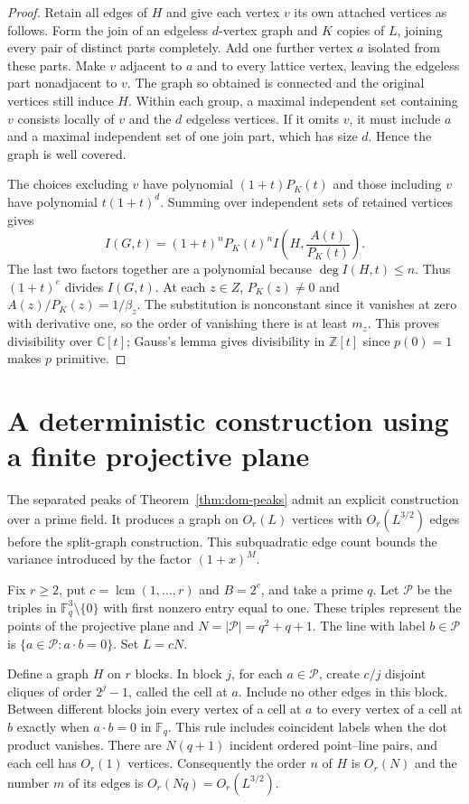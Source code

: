 \documentclass[11pt,a4paper]{article}
\begin{document}
\begin{proof}
Retain all edges of $H$ and give each vertex $v$ its own attached
vertices as follows. Form the join of an edgeless $d$-vertex graph and
$K$ copies of $L$, joining every pair of distinct parts completely.
Add one further vertex $a$ isolated from these parts. Make $v$ adjacent
to $a$ and to every lattice vertex, leaving the edgeless part
nonadjacent to $v$. The graph so obtained is connected and the original
vertices still induce $H$. Within each group, a maximal independent set
containing $v$ consists locally of $v$ and the $d$ edgeless vertices.
If it omits $v$, it must include $a$ and a maximal independent set of one
join part, which has size $d$. Hence the graph is well covered.

The choices excluding $v$ have polynomial $(1+t)P_K(t)$ and those
including $v$ have polynomial $t(1+t)^d$. Summing over independent
sets of retained vertices gives
\[
 I(G,t)=(1+t)^n P_K(t)^n
       I\!\left(H,\frac{A(t)}{P_K(t)}\right).
\]
The last two factors together are a polynomial because $\deg I(H,t)\le n$.
Thus $(1+t)^e$ divides $I(G,t)$. At each $z\in Z$, $P_K(z)\ne0$ and
$A(z)/P_K(z)=1/\beta_z$. The substitution is nonconstant
since it vanishes at zero with derivative one, so the order of vanishing
there is at least $m_z$. This proves divisibility over $\mathbb C[t]$;
Gauss's lemma gives divisibility in $\mathbb Z[t]$ since $p(0)=1$
makes $p$ primitive.
\end{proof}

\section{A deterministic construction using a finite projective plane}
\label{sec:projective-peaks}

The separated peaks of Theorem~\ref{thm:dom-peaks} admit an explicit
construction over a prime field. It produces a graph on $O_r(L)$ vertices
with $O_r(L^{3/2})$ edges before the split-graph construction. This subquadratic
edge count bounds the variance introduced by the factor $(1+x)^M$.

Fix $r\ge2$, put $c=\operatorname{lcm}(1,\ldots,r)$ and $B=2^c$,
and take a prime $q$. Let $\mathcal P$ be the triples in
$\mathbb F_q^3\setminus\{0\}$ with first nonzero entry equal to one.
These triples represent the points of the projective plane and
$N=|\mathcal P|=q^2+q+1$. The line with label $b\in\mathcal P$ is
$\{a\in\mathcal P:a\cdot b=0\}$. Set $L=cN$.

Define a graph $H$ on $r$ blocks. In block $j$, for each $a\in\mathcal P$,
create $c/j$ disjoint cliques of order $2^j-1$, called the cell at $a$.
Include no other edges in this block. Between different blocks join every
vertex of a cell at $a$ to every vertex of a cell at $b$ exactly when
$a\cdot b=0$ in $\mathbb F_q$. This rule includes coincident labels
when the dot product vanishes. There are $N(q+1)$ incident ordered
point--line pairs, and each cell has $O_r(1)$ vertices. Consequently the
order $n$ of $H$ is $O_r(N)$ and the number $m$ of its edges is
$O_r(Nq)=O_r(L^{3/2})$.
\end{document}
